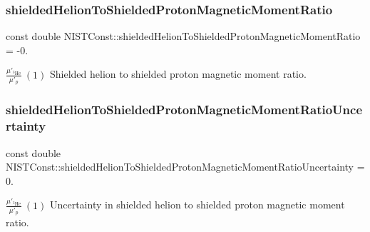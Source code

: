 \subsubsection{\texorpdfstring{shielded\+Helion\+To\+Shielded\+Proton\+Magnetic\+Moment\+Ratio}{shieldedHelionToShieldedProtonMagneticMomentRatio}}
{\footnotesize\ttfamily const double N\+I\+S\+T\+Const\+::shielded\+Helion\+To\+Shielded\+Proton\+Magnetic\+Moment\+Ratio = -\/0.}

$\frac{\mu'_{^3\textrm{He}}}{\mu'_p} \ (1)$ Shielded helion to shielded proton magnetic moment ratio. \mbox{\label{group___helion_ga31b0f8bc042eedd046490ef6b86b26d4}} 
\subsubsection{\texorpdfstring{shielded\+Helion\+To\+Shielded\+Proton\+Magnetic\+Moment\+Ratio\+Uncertainty}{shieldedHelionToShieldedProtonMagneticMomentRatioUncertainty}}
{\footnotesize\ttfamily const double N\+I\+S\+T\+Const\+::shielded\+Helion\+To\+Shielded\+Proton\+Magnetic\+Moment\+Ratio\+Uncertainty = 0.}

$\frac{\mu'_{^3\textrm{He}}}{\mu'_p} \ (1)$ Uncertainty in shielded helion to shielded proton magnetic moment ratio. 